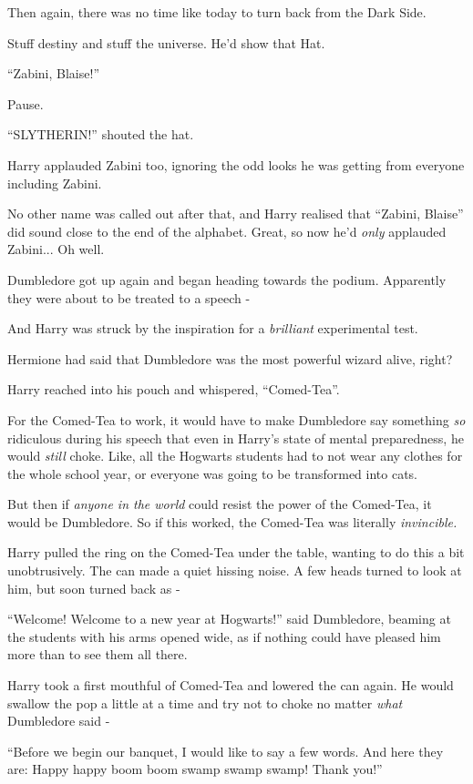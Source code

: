 Then again, there was no time like today to turn back from the Dark
Side.

Stuff destiny and stuff the universe. He'd show that Hat.

``Zabini, Blaise!''

Pause.

``SLYTHERIN!'' shouted the hat.

Harry applauded Zabini too, ignoring the odd looks he was getting from
everyone including Zabini.

No other name was called out after that, and Harry realised that
``Zabini, Blaise'' did sound close to the end of the alphabet. Great, so
now he'd \emph{only} applauded Zabini... Oh well.

Dumbledore got up again and began heading towards the podium. Apparently
they were about to be treated to a speech -

And Harry was struck by the inspiration for a \emph{brilliant}
experimental test.

Hermione had said that Dumbledore was the most powerful wizard alive,
right?

Harry reached into his pouch and whispered, ``Comed-Tea''.

For the Comed-Tea to work, it would have to make Dumbledore say
something \emph{so} ridiculous during his speech that even in Harry's
state of mental preparedness, he would \emph{still} choke. Like, all the
Hogwarts students had to not wear any clothes for the whole school year,
or everyone was going to be transformed into cats.

But then if \emph{anyone in the world} could resist the power of the
Comed-Tea, it would be Dumbledore. So if this worked, the Comed-Tea was
literally \emph{invincible.}

Harry pulled the ring on the Comed-Tea under the table, wanting to do
this a bit unobtrusively. The can made a quiet hissing noise. A few
heads turned to look at him, but soon turned back as -

``Welcome! Welcome to a new year at Hogwarts!'' said Dumbledore, beaming
at the students with his arms opened wide, as if nothing could have
pleased him more than to see them all there.

Harry took a first mouthful of Comed-Tea and lowered the can again. He
would swallow the pop a little at a time and try not to choke no matter
\emph{what} Dumbledore said -

``Before we begin our banquet, I would like to say a few words. And here
they are: Happy happy boom boom swamp swamp swamp! Thank you!''

